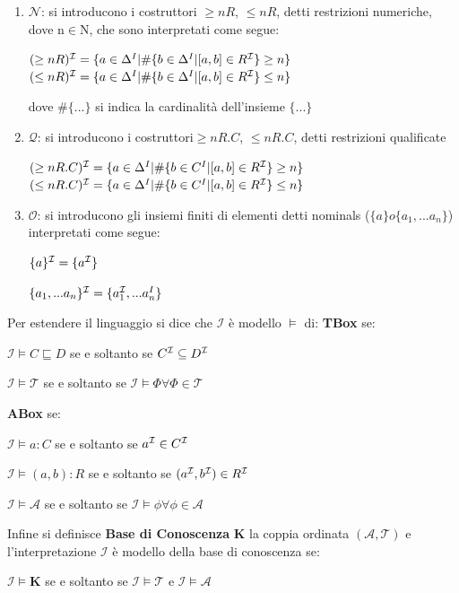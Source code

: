 \documentclass[a4paper,11pt]{article}
\newcommand{\I}{%
        \ensuremath{\mathcal{I}}\xspace}
\newcommand{\Q}{%
  \ensuremath{\mathcal{Q}}\xspace}
\newcommand{\N}{%
  \ensuremath{\mathcal{N}}\xspace}
\newcommand{\Onom}{%
  \ensuremath{\mathcal{O}}\xspace}
\newcommand{\T}{%
  \ensuremath{\mathcal{T}}\xspace}
\newcommand{\A}{%
  \ensuremath{\mathcal{A}}\xspace}
\newcommand{\K}%
        {\ensuremath{\mathbf{K}}\xspace}
\begin{document}
\begin{enumerate}
\item $\N$: si introducono i costruttori $\geq nR$, $\leq nR$, detti restrizioni numeriche, dove n$\in$N, che sono interpretati come segue:
\begin{center}
		$(\geq nR)^{\I}=\{a \in \Delta^{I}|\#\{b \in \Delta^{I} |[a,b] \in R^{\I}\}\geq n\}$\newline$(\leq nR)^{\I}=\{a \in \Delta^{I}|\#\{b \in \Delta^{I} |[a,b] \in R^{\I}\}\leq n\}$\newline
\end{center} dove $\#\{...\}$ si indica la cardinalità dell'insieme $\{...\}$
\item $\Q$: si introducono i costruttori$\geq nR.C$, $\leq nR.C$, detti restrizioni qualificate
\begin{center}
$(\geq nR.C)^{\I}=\{a \in \Delta^{I}|\#\{b \in C^{I} |[a,b] \in R^{\I}\}\geq n\}$ $(\leq nR.C)^{\I}=\{a \in \Delta^{I}|\#\{b \in C^{I} |[a,b] \in R^{\I}\}\leq n\}$
\end{center}
\item $\Onom$: si introducono gli insiemi finiti di elementi 
detti nominals ($\{a\} o \{a_1,...a_n\} $) interpretati come segue:
\begin{center}
$\{a\}^{\I}=\{a^{\I}\}$
\end{center}
\begin{center}
$\{a_1,...a_n\}^{\I}=\{a_1^{\I},...a_n^{I}\}$
\end{center}
\end{enumerate}\newpage Per estendere il linguaggio si dice che $\I$ è modello $\models$ di:\newline
\textbf{TBox} se:
\begin{center}
	$\I \models C \sqsubseteq D$ se e soltanto se $C^{\I} \subseteq D^{\I}$	
\end{center}
\begin{center}
	$\I \models \T$ se e soltanto se $\I \models \Phi \forall \Phi \in \T $
\end{center}
\textbf{ABox} se: 
\begin{center}
	$\I \models a:C$ se e soltanto se $ a^{\I} \in C^{\I}$
\end{center} 
\begin{center}
	$\I \models (a,b):R$ se e soltanto se $ (a^{\I},b^{\I}) \in R^{\I}$
\end{center}
\begin{center}
	$\I \models \A$ se e soltanto se $\I \models \phi \forall \phi \in \A $
\end{center}
Infine si definisce \textbf{Base di Conoscenza} $\K$ la coppia ordinata $(\A,\T) $ e l'interpretazione $\I$ è modello della base di conoscenza se:
\begin{center}
	$\I \models \K$ se e soltanto se $\I \models \T$ e $\I \models \A $
\end{center}
\end{document}
